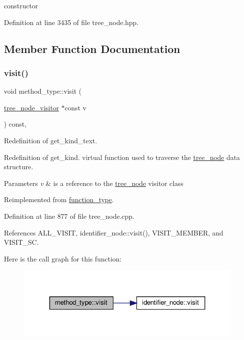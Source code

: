 constructor 



Definition at line 3435 of file tree\+\_\+node.\+hpp.



\subsection{Member Function Documentation}
\mbox{\label{structmethod__type_a5994c05dca057b061c979293c5895c41}} 
\subsubsection{\texorpdfstring{visit()}{visit()}}
{\footnotesize\ttfamily void method\+\_\+type\+::visit (\begin{DoxyParamCaption}\item[{\hyperlink{classtree__node__visitor}{tree\+\_\+node\+\_\+visitor} $\ast$const}]{v }\end{DoxyParamCaption}) const\hspace{0.3cm}{\ttfamily [override]}, {\ttfamily [virtual]}}



Redefinition of get\+\_\+kind\+\_\+text. 

Redefinition of get\+\_\+kind. virtual function used to traverse the \hyperlink{classtree__node}{tree\+\_\+node} data structure. 
\begin{DoxyParams}{Parameters}
{\em v} & is a reference to the \hyperlink{classtree__node}{tree\+\_\+node} visitor class \\
\hline
\end{DoxyParams}


Reimplemented from \hyperlink{structfunction__type_a7cfe2e272e5280c9c280b180e3a21c2b}{function\+\_\+type}.



Definition at line 877 of file tree\+\_\+node.\+cpp.



References A\+L\+L\+\_\+\+V\+I\+S\+IT, identifier\+\_\+node\+::visit(), V\+I\+S\+I\+T\+\_\+\+M\+E\+M\+B\+ER, and V\+I\+S\+I\+T\+\_\+\+SC.

Here is the call graph for this function\+:
\nopagebreak
\begin{figure}[H]
\begin{center}
\leavevmode
\includegraphics[width=317pt]{d7/d36/structmethod__type_a5994c05dca057b061c979293c5895c41_cgraph}
\end{center}
\end{figure}


